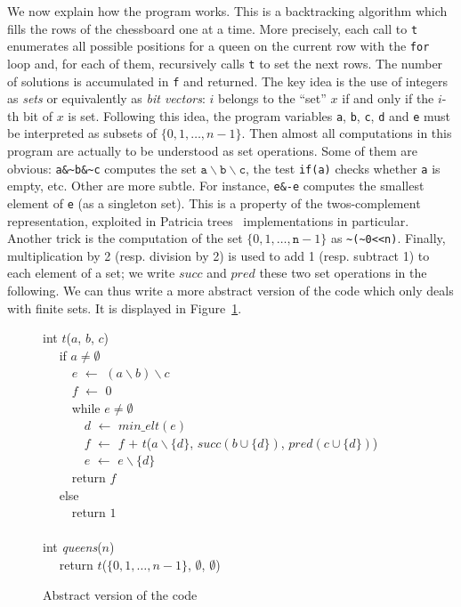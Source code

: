 \documentclass[a4paper]{llncs}
\newcommand{\kw}[1]{\textsf{#1}}
\newcommand{\minelt}[1]{\ensuremath{\mathit{min\_elt}(#1)}}
\begin{document}
We now explain how the program works. This is a backtracking algorithm
which fills the rows of the chessboard one at a time.
More precisely, each call to \texttt{t} enumerates all possible
positions for a queen on the current row with the \texttt{for} loop
and, for each of them, recursively calls \texttt{t} to set the next
rows.  The number of solutions is accumulated in \texttt{f} and
returned.  The key idea is the use of integers as \emph{sets} or
equivalently as \emph{bit vectors}: $i$ belongs to the ``set'' $x$ if and
only if the $i$-th bit of $x$ is set.
Following this idea, the program variables
\texttt{a}, \texttt{b}, \texttt{c}, \texttt{d} and \texttt{e} must
be interpreted as subsets of $\{0,1,\dots,n-1\}$.
Then almost all computations in this program are actually to be
understood as set operations. Some of them are obvious: \verb!a&~b&~c!
computes the set $\mathtt{a}\backslash\mathtt{b}\backslash\mathtt{c}$,
the test \verb!if(a)! checks whether \texttt{a} is empty, etc. Other
are more subtle. For instance, \verb!e&-e! computes the smallest
element of \texttt{e} (as a singleton set). This is a 
property of the twos-complement representation, exploited in
Patricia trees~\cite{patricia} implementations in particular.
Another trick is the computation of the set
$\{0,1,\dots,\mathtt{n}-1\}$ as \verb!~(~0<<n)!. Finally,
multiplication by 2 (resp. division by 2) is used to add 1 (resp.
subtract 1) to each element of a set; we write $\mathit{succ}$ and
$\mathit{pred}$ these two 
set operations in the following. We can thus write a more
abstract version of the code which only deals with finite sets. It is
displayed in Figure~\ref{fig:abstract}.

\begin{figure}[t]
  \hrulefill\vspace{-0.2em}
{\begin{obeylines}
  \kw{int} $t$($a$, $b$, $c$) 
  ~~ \kw{if} $a \not= \emptyset$ 
  ~~~~ $e$ $\leftarrow$ $(a \backslash  b) \backslash c$ 
  ~~~~ $f$ $\leftarrow$ 0 
  ~~~~ \kw{while} $e \not=\emptyset$ 
  ~~~~~~ $d$ $\leftarrow$ $\minelt{e}$ 
  ~~~~~~ $f$ $\leftarrow$ $f$ $+$ $t$($a\backslash \{d\}$, $\mathit{succ}(b\cup\{d\})$, $\mathit{pred}(c\cup\{d\})$) 
  ~~~~~~ $e$ $\leftarrow$ $e \backslash  \{d\}$ 
  ~~~~ \kw{return} $f$ 
  ~~ \kw{else} 
  ~~~~ \kw{return} $1$ 
  ~~ 
  \kw{int} \textit{queens}($n$) 
  ~~ \kw{return} $t$($\{0,1,\dots,n-1\}$, $\emptyset$, $\emptyset$)
\end{obeylines}}
\vspace{-0.6em}\hrulefill\vspace{-1em}
  \caption{Abstract version of the code}
  \label{fig:abstract}
\end{figure}
\end{document}
